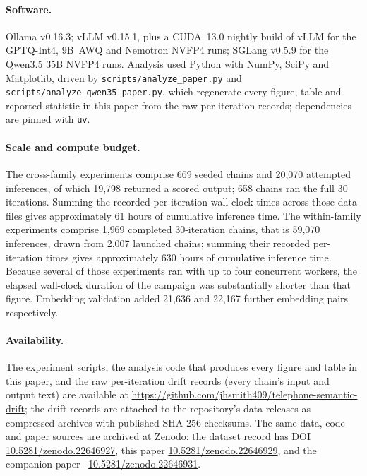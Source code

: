 \documentclass[11pt]{article}
\begin{document}
\paragraph{Software.}
Ollama v0.16.3; vLLM v0.15.1, plus a CUDA~13.0 nightly build of vLLM for the
GPTQ-Int4, 9B~AWQ and Nemotron NVFP4 runs; SGLang v0.5.9 for the Qwen3.5
35B NVFP4 runs. Analysis used Python
with NumPy, SciPy and Matplotlib, driven by
\texttt{scripts/\allowbreak analyze\_paper.py} and
\texttt{scripts/\allowbreak analyze\_qwen35\_paper.py}, which regenerate every
figure, table and reported statistic in this paper from the raw per-iteration
records; dependencies are pinned with \texttt{uv}.

\paragraph{Scale and compute budget.}
The cross-family experiments comprise 669 seeded chains and 20{,}070 attempted
inferences, of which 19{,}798 returned a scored output; 658 chains ran the full
30 iterations. Summing the recorded per-iteration wall-clock times across those
data files gives approximately 61 hours of cumulative inference time. The
within-family experiments comprise 1{,}969 completed 30-iteration chains, that
is 59{,}070 inferences, drawn from 2{,}007 launched chains; summing their
recorded per-iteration times gives approximately 630 hours of cumulative
inference time. Because several of those experiments ran with up to four
concurrent workers, the elapsed wall-clock duration of the campaign was
substantially shorter than that figure. Embedding validation added 21{,}636 and
22{,}167 further embedding pairs respectively.

\paragraph{Availability.}
The experiment scripts, the analysis code that produces every figure and
table in this paper, and the raw per-iteration drift records (every chain's
input and output text) are available at
\url{https://github.com/jhsmith409/telephone-semantic-drift}; the drift
records are attached to the repository's data releases as compressed archives
with published SHA-256 checksums. The same data, code and paper sources are
archived at Zenodo: the dataset record has DOI
\href{https://doi.org/10.5281/zenodo.22646927}{10.5281/zenodo.22646927}, this paper
\href{https://doi.org/10.5281/zenodo.22646929}{10.5281/zenodo.22646929}, and the companion
paper~\citep{smith2026generations} \href{https://doi.org/10.5281/zenodo.22646931}{10.5281/zenodo.22646931}.
\end{document}
